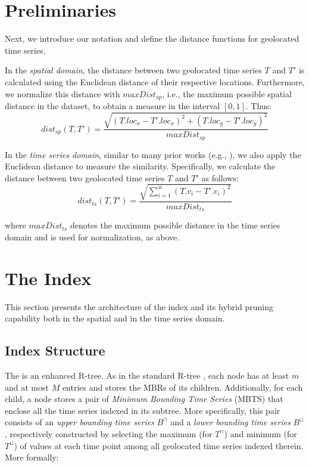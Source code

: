 
\graphicspath{{Papers/SIGSpatial2017/}{Papers/SIGSpatial2018/}}

\section{Preliminaries}
\label{subsec:preliminaries}
Next, we introduce our notation and define the distance functions for geolocated time series.

In the {\em spatial domain}, the distance between two geolocated time series $T$ and $T'$ is calculated using the Euclidean distance of their respective locations. Furthermore, we normalize this distance with $maxDist_{sp}$, i.e., the maximum possible spatial distance in the dataset, to obtain a measure in the interval $[0,1]$. Thus:
\begin{equation} \label{eq:dist_sp}
 dist_{sp}(T, T') = \frac{\sqrt{(T.loc_x - T'.loc_x)^2 + (T.loc_y - T'.loc_y)^2}}{maxDist_{sp}}
\end{equation} \label{eq:2}

In the {\em time series domain}, similar to many prior works (e.g., \cite{shieh2008kdd}), we also apply the Euclidean distance to measure the similarity. Specifically, we calculate the distance between two geolocated time series $T$ and $T'$ as follows:
\begin{equation} \label{eq:dist_ts}
 dist_{ts}(T, T') = \frac{\sqrt{\displaystyle \sum_{i=1}^{w}(T.v_i - T'.v_i)^2}}{maxDist_{ts}}
\end{equation}

\noindent where $maxDist_{ts}$ denotes the maximum possible distance in the time series domain and is used for normalization, as above.

\section{The \tsr Index}
\label{subsec:tsr_tree}
This section presents the architecture of the \tsr index and its hybrid pruning capability both in the spatial and in the time series domain.

\subsection{Index Structure}
\label{subsec:index_structure}

The \tsr is an enhanced R-tree. As in the standard R-tree \cite{Guttman1984}, each node has at least $m$ and at most $M$ entries and stores the MBRs of its children. Additionally, for each child, a node stores a pair of \emph{Minimum Bounding Time Series} (MBTS) that enclose all the time series indexed in its subtree. More specifically, this pair consists of an \emph{upper bounding time series} $B^{\sqcap}$ and a \emph{lower bounding time series} $B^{\sqcup}$, respectively constructed by selecting the maximum (for $T^{\sqcap}$) and minimum (for $T^{\sqcup}$) of values at each time point among all geolocated time series indexed therein. More formally:

